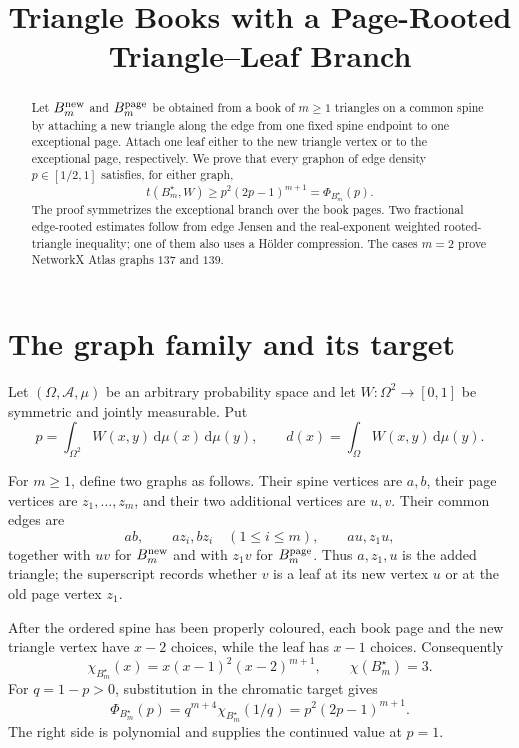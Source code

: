 \documentclass[11pt]{article}
\title{Triangle Books with a Page-Rooted Triangle--Leaf Branch}
\author{}
\date{}
\newcommand{\dd}{\,\mathrm d}
\begin{document}
\maketitle

\begin{abstract}
Let $B_m^{\rm new}$ and $B_m^{\rm page}$ be obtained from a book of
$m\geq1$ triangles on a common spine by attaching a new triangle along the
edge from one fixed spine endpoint to one exceptional page.  Attach one
leaf either to the new triangle vertex or to the exceptional page,
respectively.  We prove that every graphon of edge density
$p\in[1/2,1]$ satisfies, for either graph,
\[
 t(B_m^\star,W)\geq p^2(2p-1)^{m+1}
 =\Phi_{B_m^\star}(p).
\]
The proof symmetrizes the exceptional branch over the book pages.  Two
fractional edge-rooted estimates follow from edge Jensen and the
real-exponent weighted rooted-triangle inequality; one of them also uses a
H\"older compression.  The cases $m=2$ prove NetworkX Atlas graphs $137$
and $139$.
\end{abstract}


\section{The graph family and its target}

Let $(\Omega,\mathcal A,\mu)$ be an arbitrary probability space and let
$W\colon\Omega^2\to[0,1]$ be symmetric and jointly measurable.  Put
\[
 p=\int_{\Omega^2}W(x,y)\dd\mu(x)\dd\mu(y),
 \qquad
 d(x)=\int_\Omega W(x,y)\dd\mu(y).
\]

For $m\geq1$, define two graphs as follows.  Their spine vertices are
$a,b$, their page vertices are $z_1,\ldots,z_m$, and their two additional
vertices are $u,v$.  Their common edges are
\[
 ab,\qquad az_i,bz_i\quad(1\leq i\leq m),
 \qquad au,z_1u,
\]
together with $uv$ for $B_m^{\rm new}$ and with $z_1v$ for
$B_m^{\rm page}$.  Thus $a,z_1,u$ is the added triangle; the superscript
records whether $v$ is a leaf at its new vertex $u$ or at the old page
vertex $z_1$.

After the ordered spine has been properly coloured, each book page and the
new triangle vertex have $x-2$ choices, while the leaf has $x-1$ choices.
Consequently
\begin{equation}
 \chi_{B_m^\star}(x)=x(x-1)^2(x-2)^{m+1},
 \qquad \chi(B_m^\star)=3.
 \label{eq:chromatic}
\end{equation}
For $q=1-p>0$, substitution in the chromatic target gives
\begin{equation}
 \Phi_{B_m^\star}(p)
 =q^{m+4}\chi_{B_m^\star}(1/q)
 =p^2(2p-1)^{m+1}.
 \label{eq:target}
\end{equation}
The right side is polynomial and supplies the continued value at $p=1$.
\end{document}
